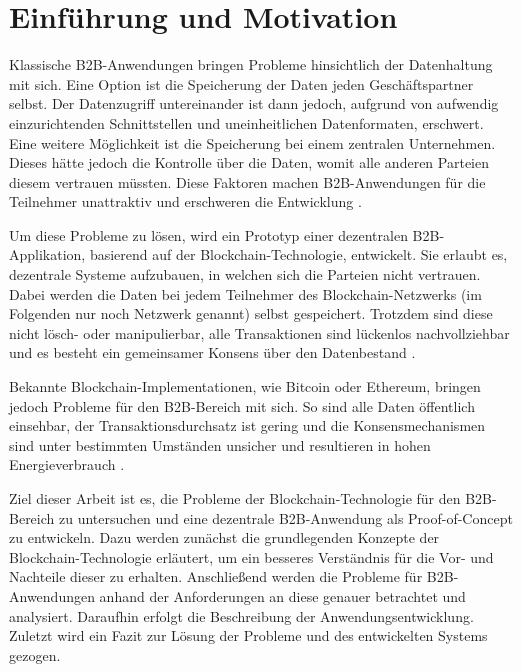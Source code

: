 \chapter{Einführung und Motivation}
\label{cha:einfuehrung}

Klassische \acs{B2B}-Anwendungen bringen Probleme hinsichtlich der Datenhaltung mit sich. Eine Option ist die Speicherung der Daten jeden Geschäftspartner selbst. Der Datenzugriff untereinander ist dann jedoch, aufgrund von aufwendig einzurichtenden Schnittstellen und uneinheitlichen Datenformaten, erschwert. Eine weitere Möglichkeit ist die Speicherung bei einem zentralen Unternehmen. Dieses hätte jedoch die Kontrolle über die Daten, womit alle anderen Parteien diesem vertrauen müssten. Diese Faktoren machen \acs{B2B}-Anwendungen für die Teilnehmer unattraktiv und erschweren die Entwicklung \cite{KorpelaDigitalSupplyChain2017}\cite{WustyouneedBlockchain2017}.

Um diese Probleme zu lösen, wird ein Prototyp einer dezentralen \acs{B2B}-Applikation, basierend auf der Blockchain-Technologie, entwickelt. Sie erlaubt es, dezentrale Systeme aufzubauen, in welchen sich die Parteien nicht vertrauen. Dabei werden die Daten bei jedem Teilnehmer des Blockchain-Netzwerks (im Folgenden nur noch Netzwerk genannt) selbst gespeichert. Trotzdem sind diese nicht lösch- oder manipulierbar, alle Transaktionen sind lückenlos nachvollziehbar und es besteht ein gemeinsamer Konsens über den Datenbestand \cite{CrosbyBlockChainTechnologyBitcoin2016}.

Bekannte Blockchain-Implementationen, wie Bitcoin oder Ethereum, bringen jedoch Probleme für den \acs{B2B}-Bereich mit sich. So sind alle Daten öffentlich einsehbar, der Transaktionsdurchsatz ist gering und die Konsensmechanismen sind unter bestimmten Umständen unsicher und resultieren in hohen Energieverbrauch \cite{Gramolidangerprivateblockchains2016}\cite{NakamotoBitcoinPeertoPeerElectronic2008}\cite{EthereumTeamEthereumWhitePaper2017}. 

Ziel dieser Arbeit ist es, die Probleme der Blockchain-Technologie für den \acs{B2B}-Bereich zu untersuchen und eine dezentrale \acs{B2B}-Anwendung als Proof-of-Concept zu entwickeln. Dazu werden zunächst die grundlegenden Konzepte der Blockchain-Technologie erläutert, um ein besseres Verständnis für die Vor- und Nachteile dieser zu erhalten. Anschließend werden die Probleme für \acs{B2B}-Anwendungen anhand der Anforderungen an diese genauer betrachtet und analysiert. Daraufhin erfolgt die Beschreibung der Anwendungsentwicklung. Zuletzt wird ein Fazit zur Lösung der Probleme und des entwickelten Systems gezogen.
